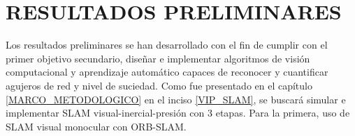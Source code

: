 \chapter{RESULTADOS PRELIMINARES}

Los resultados preliminares se han desarrollado con el fin de cumplir con el primer objetivo secundario, diseñar e implementar algoritmos de visión computacional y aprendizaje automático capaces de reconocer y cuantificar agujeros de red y nivel de suciedad. Como fue presentado en el capítulo \ref{MARCO_METODOLOGICO} en el inciso \ref{VIP_SLAM}, se buscará simular e implementar SLAM visual-inercial-presión con 3 etapas. Para la primera, uso de SLAM visual monocular con ORB-SLAM. 